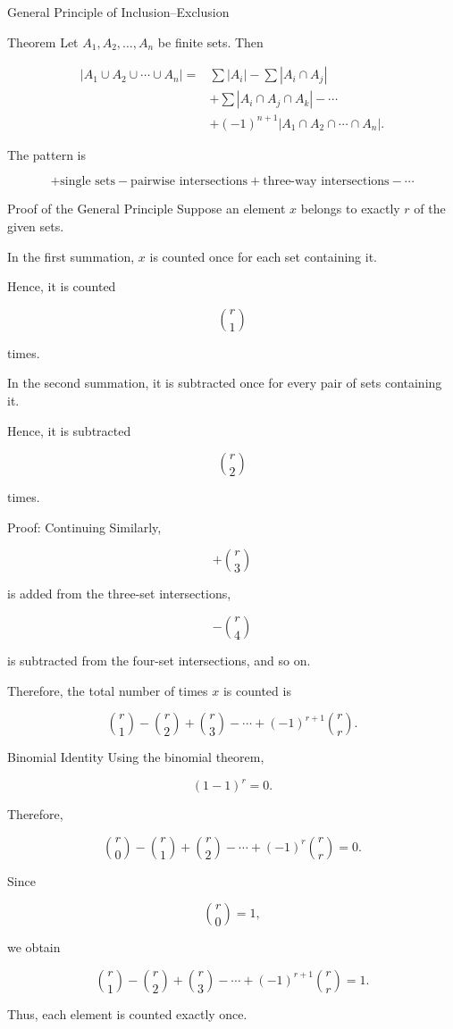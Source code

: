 \documentclass[aspectratio=169]{beamer}
\begin{document}
\begin{frame}{General Principle of Inclusion--Exclusion}
\small
\begin{block}{Theorem}
Let $A_1,A_2,\ldots,A_n$ be finite sets. Then
\end{block}

\[
\begin{aligned}
|A_1\cup A_2\cup\cdots\cup A_n|
={}&\sum |A_i|
-\sum |A_i\cap A_j|\\
&+\sum |A_i\cap A_j\cap A_k|
-\cdots\\
&+(-1)^{n+1}
|A_1\cap A_2\cap\cdots\cap A_n|.
\end{aligned}
\]

The pattern is

\[
+\text{single sets}
-\text{pairwise intersections}
+\text{three-way intersections}
-\cdots
\]
\end{frame}

\begin{frame}{Proof of the General Principle}
Suppose an element $x$ belongs to exactly $r$ of the given sets.

In the first summation, $x$ is counted once for each set containing it.

Hence, it is counted

\[
\binom{r}{1}
\]

times.

In the second summation, it is subtracted once for every pair of sets containing it.

Hence, it is subtracted

\[
\binom{r}{2}
\]

times.
\end{frame}

\begin{frame}{Proof: Continuing}
Similarly,

\[
+\binom{r}{3}
\]

is added from the three-set intersections,

\[
-\binom{r}{4}
\]

is subtracted from the four-set intersections, and so on.

Therefore, the total number of times $x$ is counted is

\[
\binom{r}{1}
-\binom{r}{2}
+\binom{r}{3}
-\cdots
+(-1)^{r+1}\binom{r}{r}.
\]
\end{frame}

\begin{frame}{Binomial Identity}
Using the binomial theorem,

\[
(1-1)^r=0.
\]

Therefore,

\[
\binom{r}{0}
-\binom{r}{1}
+\binom{r}{2}
-\cdots
+(-1)^r\binom{r}{r}=0.
\]

Since

\[
\binom{r}{0}=1,
\]

we obtain

\[
\boxed{
\binom{r}{1}
-\binom{r}{2}
+\binom{r}{3}
-\cdots
+(-1)^{r+1}\binom{r}{r}=1.
}
\]

Thus, each element is counted exactly once.
\end{frame}
\end{document}

